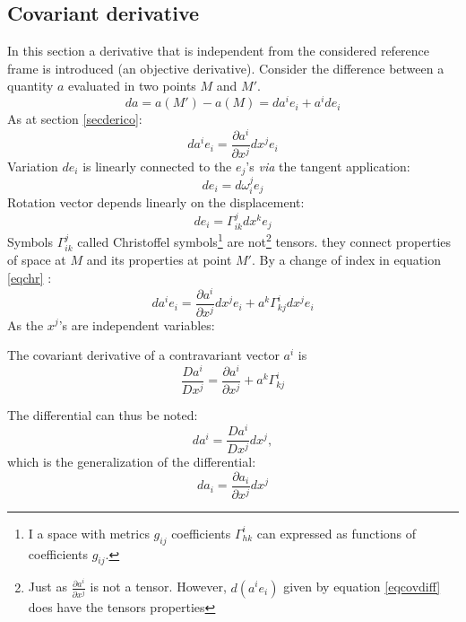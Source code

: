 \documentclass[12pt]{book}
\begin{document}
\subsection{Covariant derivative}\label{secandericov}
In this section a derivative that is independent from the considered
reference frame is introduced (an objective derivative). Consider the
difference 
between a quantity $a$ evaluated in two points $M$ and $M'$. 
 \begin{equation}
da=a(M')-a(M)=da^i e_i+a^i de_i
\end{equation}
As at section \ref{secderico}:
\begin{equation}
da^i e_i=\frac{\partial a^i}{\partial x^j}dx^j e_i
\end{equation}
Variation $de_i$ is linearly connected to the $e_j$'s {\it via} the tangent
application: 
\begin{equation}
de_i=d\omega^j_ie_j
\end{equation}
Rotation vector depends linearly on the displacement:
\begin{equation}\label{eqchr}
de_i=\Gamma^{j}_{ik}dx^ke_j
\end{equation}
Symbols $\Gamma^{j}_{ik}$ called Christoffel symbols\footnote{%
I a space with metrics $g_{ij}$
coefficients $\Gamma^{i}_{hk}$ can expressed as functions of coefficients
$g_{ij}$. 
}%
 are not\footnote{Just as $\frac{\partial a^i}{\partial x^j}$ is not a
tensor. However, $d(a^ie_i)$ given by equation \ref{eqcovdiff} does
have the tensors properties}%
 tensors. they
connect properties of space at $M$ and its properties at point $M'$. By a
change of index in equation \ref{eqchr} :
\begin{equation}\label{eqcovdiff}
da^i e_i=\frac{\partial a^i}{\partial x^j}dx^j e_i+a^k\Gamma^i_{kj}
dx^je_i 
\end{equation}
As the $x^j$'s are independent variables:
\begin{defn}
The covariant derivative of a contravariant vector $a^i$ is
\begin{equation}\label{eqdefdercov}
\frac{Da^i}{Dx^j}=\frac{\partial a^i}{\partial x^j}+a^k\Gamma^i_{kj} 
\end{equation}
\end{defn}
The differential can thus be noted:
\begin{equation}
da^i=\frac{Da^i}{Dx^j}dx^j,
\end{equation}
which is the generalization of the differential:
\begin{equation}
da_i=\frac{\partial a_i}{\partial x^j}dx^j
\end{equation}
\end{document}
